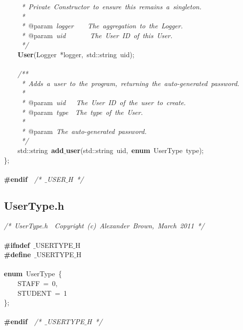 \mbox{}\textit{\ \ \ \ \ *\ Private\ Constructor\ to\ ensure\ this\ remains\ a\ singleton.} \\
\mbox{}\textit{\ \ \ \ \ *} \\
\mbox{}\textit{\ \ \ \ \ *\ }@param\textit{\ logger\ \ \ \ The\ aggregation\ to\ the\ Logger.} \\
\mbox{}\textit{\ \ \ \ \ *\ }@param\textit{\ uid\ \ \ \ \ \ \ The\ User\ ID\ of\ this\ User.} \\
\mbox{}\textit{\ \ \ \ \ */} \\
\mbox{}\ \ \ \ \textbf{User}(Logger\ *logger,\ std::string\ uid); \\
\mbox{} \\
\mbox{}\ \ \ \ \textit{/**} \\
\mbox{}\textit{\ \ \ \ \ *\ Adds\ a\ user\ to\ the\ program,\ returning\ the\ auto-generated\ password.} \\
\mbox{}\textit{\ \ \ \ \ *} \\
\mbox{}\textit{\ \ \ \ \ *\ }@param\textit{\ uid\ \ \ The\ User\ ID\ of\ the\ user\ to\ create.} \\
\mbox{}\textit{\ \ \ \ \ *\ }@param\textit{\ type\ \ The\ type\ of\ the\ User.} \\
\mbox{}\textit{\ \ \ \ \ *} \\
\mbox{}\textit{\ \ \ \ \ *\ }@param\textit{\ The\ auto-generated\ password.} \\
\mbox{}\textit{\ \ \ \ \ */} \\
\mbox{}\ \ \ \ std::string\ \textbf{add$\_$user}(std::string\ uid,\ \textbf{enum}\ UserType\ type); \\
\mbox{}\}; \\
\mbox{} \\
\mbox{}\textbf{\#endif}\ \ \textit{/*\ $\_$USER$\_$H\ */} \\

\clearpage
\normalsize
\rmfamily
\subsection{UserType.h}
\scriptsize
\sffamily
\noindent
\mbox{}\textit{/*\ UserType.h\ \ Copyright\ (c)\ Alexander\ Brown,\ March\ 2011\ */} \\
\mbox{} \\
\mbox{}\textbf{\#ifndef}\ $\_$USERTYPE$\_$H \\
\mbox{}\textbf{\#define}\ $\_$USERTYPE$\_$H \\
\mbox{} \\
\mbox{}\textbf{enum}\ UserType\ \{ \\
\mbox{}\ \ \ \ STAFF\ =\ 0, \\
\mbox{}\ \ \ \ STUDENT\ =\ 1 \\
\mbox{}\}; \\
\mbox{} \\
\mbox{}\textbf{\#endif}\ \ \textit{/*\ $\_$USERTYPE$\_$H\ */} \\

\clearpage
